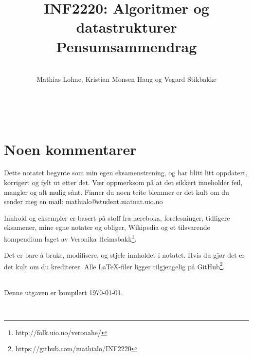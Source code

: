 \documentclass[10pt, norsk, a4paper, sans, hidelinks, twoside]{article}
\title{\titlefontthin INF2220: Algoritmer og datastrukturer \\ Pensumsammendrag}
\author{\vspace{30pt}\\\titlefontthin Mathias Lohne, Kristian Monsen Haug og Vegard Stikbakke}
\date{}
\newcommand{\mono}[1]{{\monofont \small #1}}
\numberwithin{myTheo}{subsection}
\begin{document}
\maketitle
\thispagestyle{empty}
\newpage
\thispagestyle{empty}
~\newpage
{}
\thispagestyle{plain}

\section*{Noen kommentarer}
Dette notatet begynte som min egen eksamenstrening, og har blitt litt oppdatert, korrigert og fylt ut etter det. Vær oppmerksom på at det sikkert inneholder feil, mangler og alt mulig sånt. Finner du noen teite blemmer er det kult om du sender meg en mail: \mono{mathialo@student.matnat.uio.no}

Innhold og eksempler er basert på stoff fra læreboka, forelesninger, tidligere eksamener, mine egne notater og obliger, Wikipedia og et tilsvarende kompendium laget av Veronika Heimsbakk\footnote{http://folk.uio.no/veronahe/}.

Det er bare å bruke, modifisere, og stjele innholdet i notatet. Hvis du gjør det er det kult om du krediterer. Alle \LaTeX-filer ligger tilgjengelig på GitHub\footnote{https://github.com/mathialo/INF2220}.

~\\Denne utgaven er kompilert \today.

~\\

\newpage
\thispagestyle{plain}



\tableofcontents
\thispagestyle{plain}
\newpage
{}


\newpage

\newpage

\newpage

\newpage

\newpage

\newpage

\newpage

\newpage
\appendix

\end{document}
